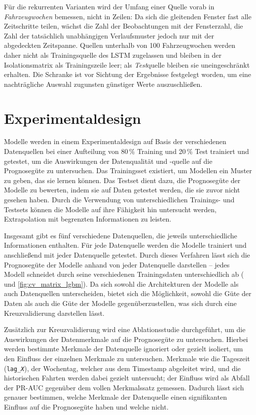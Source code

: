 Für die rekurrenten Varianten wird der Umfang einer Quelle vorab in \emph{Fahrzeugwochen} bemessen, nicht in Zeilen: Da sich die gleitenden Fenster fast alle Zeitschritte teilen, wächst die Zahl der Beobachtungen mit der Fensterzahl, die Zahl der tatsächlich unabhängigen Verlaufsmuster jedoch nur mit der abgedeckten Zeitspanne. Quellen unterhalb von 100 Fahrzeugwochen werden daher nicht als Trainingsquelle des LSTM zugelassen und bleiben in der Isolationsmatrix als Trainingszeile leer; als \emph{Test}quelle bleiben sie uneingeschränkt erhalten. Die Schranke ist vor Sichtung der Ergebnisse festgelegt worden, um eine nachträgliche Auswahl zugunsten günstiger Werte auszuschließen.


\section{Experimentaldesign}
\label{sec:experimentaldesign}

Modelle werden in einem Experimentaldesign auf Basis der verschiedenen Datenquellen bei einer Aufteilung von 80\,\% Training und 20\,\% Test trainiert und getestet, um die Auswirkungen der Datenqualität und -quelle auf die Prognosegüte zu untersuchen. Das Trainingsset existiert, um Modellen ein Muster zu geben, das sie lernen können. Das Testset dient dazu, die Prognosegüte der Modelle zu bewerten, indem sie auf Daten getestet werden, die sie zuvor nicht gesehen haben. Durch die Verwendung von unterschiedlichen Trainings- und Testsets können die Modelle auf ihre Fähigkeit hin untersucht werden, Extrapolation mit begrenzten Informationen zu leisten. 

Insgesamt gibt es fünf verschiedene Datenquellen, die jeweils unterschiedliche Informationen enthalten. Für jede Datenquelle werden die Modelle trainiert und anschließend mit jeder Datenquelle getestet. Durch dieses Verfahren lässt sich die Prognosegüte der Modelle anhand von jeder Datenquelle darstellen -- jedes Modell schneidet durch seine verschiedenen Trainingsdaten unterschiedlich ab ( und \cref{fig:cv_matrix_lgbm}). Da sich sowohl die Architekturen der Modelle als auch Datenquellen unterscheiden, bietet sich die Möglichkeit, sowohl die Güte der Daten als auch die Güte der Modelle gegenüberzustellen, was sich durch eine Kreuzvalidierung darstellen lässt.

Zusätzlich zur Kreuzvalidierung wird eine Ablationsstudie durchgeführt, um die Auswirkungen der Datenmerkmale auf die Prognosegüte zu untersuchen. Hierbei werden bestimmte Merkmale der Datenquelle ignoriert oder gezielt isoliert, um den Einfluss der einzelnen Merkmale zu untersuchen. Merkmale wie die Tageszeit (\texttt{lag\_\emph{X}}), der Wochentag, welcher aus dem Timestamp abgeleitet wird, und die historischen Fahrten werden dabei gezielt untersucht; der Einfluss wird als Abfall der PR-AUC gegenüber dem vollen Merkmalssatz gemessen. Dadurch lässt sich genauer bestimmen, welche Merkmale der Datenquelle einen signifikanten Einfluss auf die Prognosegüte haben und welche nicht.

